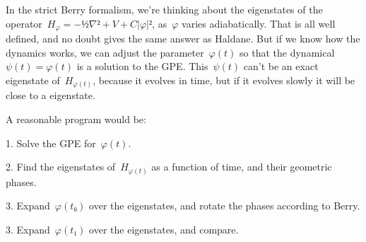 In the strict Berry formalism, we're thinking about the eigenstates of the operator~$H_φ=-½∇²+V+C|φ|²$, as~$φ$ varies adiabatically.  That is all well defined, and no doubt gives the same answer as Haldane.  But if we know how the dynamics works, we can adjust the parameter~$φ(t)$ so that the dynamical~$ψ(t)=φ(t)$ is a solution to the GPE.  This~$ψ(t)$ can't be an exact eigenstate of~$H_{φ(t)}$, because it evolves in time, but if it evolves slowly it will be close to a eigenstate.

A reasonable program would be:

\item{1.} Solve the GPE for~$φ(t)$.

\item{2.} Find the eigenstates of~$H_{φ(t)}$ as a function of time, and their geometric phases.

\item{3.} Expand~$φ(t₀)$ over the eigenstates, and rotate the phases according to Berry.

\item{3.} Expand~$φ(t₁)$ over the eigenstates, and compare.



\bye